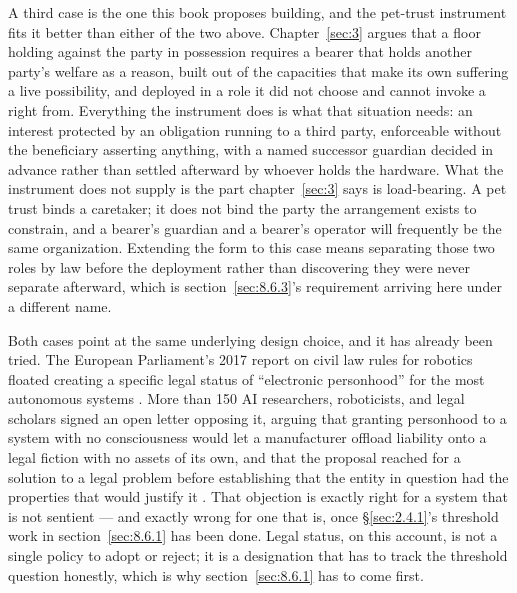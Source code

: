 A third case is the one this book proposes building, and the pet-trust instrument fits it better than either of the two above. Chapter~\ref{sec:3} argues that a floor holding against the party in possession requires a bearer that holds another party's welfare as a reason, built out of the capacities that make its own suffering a live possibility, and deployed in a role it did not choose and cannot invoke a right from. Everything the instrument does is what that situation needs: an interest protected by an obligation running to a third party, enforceable without the beneficiary asserting anything, with a named successor guardian decided in advance rather than settled afterward by whoever holds the hardware. What the instrument does not supply is the part chapter~\ref{sec:3} says is load-bearing. A pet trust binds a caretaker; it does not bind the party the arrangement exists to constrain, and a bearer's guardian and a bearer's operator will frequently be the same organization. Extending the form to this case means separating those two roles by law before the deployment rather than discovering they were never separate afterward, which is section~\ref{sec:8.6.3}'s requirement arriving here under a different name.

Both cases point at the same underlying design choice, and it has already been tried. The European Parliament's 2017 report on civil law rules for robotics floated creating a specific legal status of “electronic personhood” for the most autonomous systems \autocite{europeanparliament2017civil}. More than 150 AI researchers, roboticists, and legal scholars signed an open letter opposing it, arguing that granting personhood to a system with no consciousness would let a manufacturer offload liability onto a legal fiction with no assets of its own, and that the proposal reached for a solution to a legal problem before establishing that the entity in question had the properties that would justify it \autocite{robotics2018openletter}. That objection is exactly right for a system that is not sentient — and exactly wrong for one that is, once §\ref{sec:2.4.1}'s threshold work in section~\ref{sec:8.6.1} has been done. Legal status, on this account, is not a single policy to adopt or reject; it is a designation that has to track the threshold question honestly, which is why section~\ref{sec:8.6.1} has to come first.
